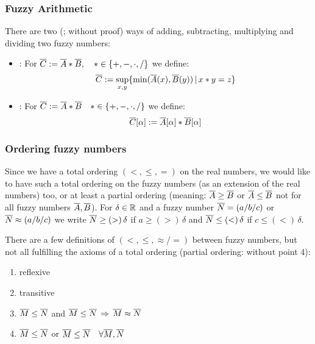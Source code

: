 \subsubsection{Fuzzy Arithmetic}
There are two (; without proof) ways of adding, subtracting, multiplying and dividing two fuzzy numbers:\\
\begin{itemize}
\item {}: For $\overline{C}:=\overline{A} \ast \overline{B},\quad \ast\in\{+,-,\cdot,/ \}$ we define:
	\[ \overline{C}:=\sup_{x,y} \{ \min(\overline{A}(x),\overline{B}(y))\, |\, x\ast y=z \} \]
\item {}: For $\overline{C}:=\overline{A} \ast \overline{B} \quad\ast\in\{+,-,\cdot,/ \}$ we define:
	\[ \overline{C}[\alpha]:=\overline{A}[\alpha] \ast \overline{B}[\alpha] \]
\end{itemize}




\subsubsection{Ordering fuzzy numbers}
Since we have a total ordering $(<,\leq,=)$ on the real numbers, we would like to have such a total ordering on the fuzzy numbers (as an extension of the real numbers) too, or at least a partial ordering (meaning: $\overline{A}\geq\overline{B}$ or $\overline{A}\leq\overline{B}$ not for all fuzzy numbers $\overline{A},\overline{B}$).
For $\delta\in\mathbb{R}$ and a fuzzy number $\overline{N}=(a/b/c)$ or $\overline{N}\approx(a/b/c)$ we write $\overline{N}\geq(>)\,\delta$ if $a\geq(>)\,\delta$ and $\overline{N}\leq(<)\,\delta$ if $c\leq(<)\,\delta$.

There are a few definitions of $(<,\leq,\approx/=)$ between fuzzy numbers, but not all fulfilling the axioms of a total ordering (partial ordering: without point 4):
\begin{enumerate}[1.]
\item reflexive
\item transitive
\item $\overline{M}\leq\overline{N}$ and $\overline{M}\leq\overline{N}\, \Rightarrow\, \overline{M}\approx\overline{N}$
\item $\overline{M}\leq\overline{N}$ or $\overline{M}\leq\overline{N}\quad \forall \overline{M},\overline{N}$
\end{enumerate}

